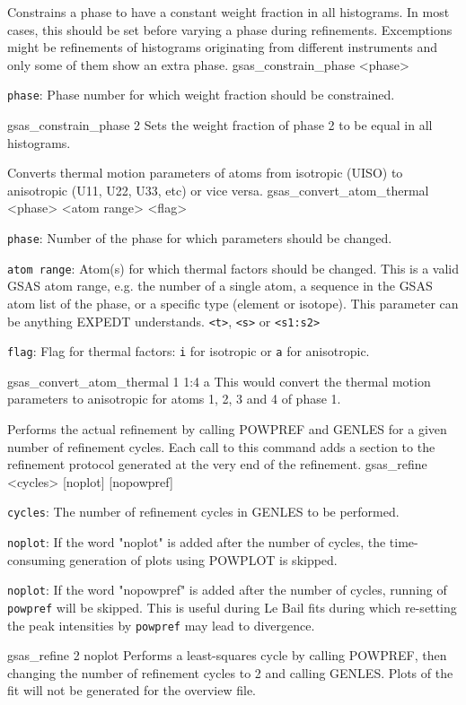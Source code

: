 {
Constrains a phase to have a constant weight fraction in all histograms.  In most cases, this should be set before varying a phase during refinements. Excemptions might be refinements of histograms originating from different instruments and only some of them show an extra phase.
}{
gsas\_constrain\_phase <phase>
}{
\item \texttt{phase}:  Phase number for which weight fraction should be constrained.
}{
gsas\_constrain\_phase 2
}{
Sets the weight fraction of phase 2 to be equal in all histograms. 
}

{
Converts thermal motion parameters of atoms from isotropic (UISO) to anisotropic (U11, U22, U33, etc) or vice versa.
}{
gsas\_convert\_atom\_thermal <phase> <atom range> <flag>
}{
\item \texttt{phase}: Number of the phase for which parameters should be changed.
\item \texttt{atom range}: Atom(s) for which thermal factors should be changed.  This is a valid GSAS atom range, e.g. the number of a single atom, a sequence in the GSAS atom list of the phase, or a specific type (element or isotope). This parameter can be anything EXPEDT understands. \texttt{<t>}, \texttt{<s>} or \texttt{<s1:s2>}
\item \texttt{flag}:  Flag for thermal factors: \texttt{i} for isotropic or \texttt{a} for anisotropic.
}{
gsas\_convert\_atom\_thermal 1 1:4 a
}{
This would convert the thermal motion parameters to anisotropic for atoms 1, 2, 3 and 4 of phase 1.
}

{
Performs the actual refinement by calling POWPREF and GENLES for a given number of refinement cycles. Each call to this command adds a section to the refinement protocol generated at the very end of the refinement.
}{
gsas\_refine <cycles> [noplot] [nopowpref]
}{
\item \texttt{cycles}: The number of refinement cycles in GENLES to be performed.
\item \texttt{noplot}: If the word "noplot" is added after the number of cycles, the time-consuming generation of plots using POWPLOT is skipped.
\item \texttt{noplot}: If the word "nopowpref" is added after the number of cycles, running of \texttt{powpref} will be skipped. This is useful during Le Bail fits during which re-setting the peak intensities by \texttt{powpref} may lead to divergence.
}{
gsas\_refine 2 noplot
}{
Performs a least-squares cycle by calling POWPREF, then changing the number of refinement cycles to 2 and calling GENLES. Plots of the fit will not be generated for the overview file.
}

